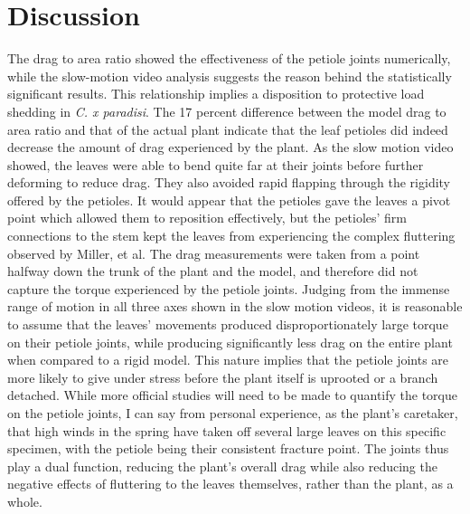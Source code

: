 \section{Discussion}

	The drag to area ratio showed the effectiveness of the petiole joints numerically, while the slow-motion video analysis suggests the reason behind the statistically significant results. This relationship implies a disposition to protective load shedding in \emph{C. x paradisi}.
	The 17 percent difference between the model drag to area ratio and that of the actual plant indicate that the leaf petioles did indeed decrease the amount of drag experienced by the plant. As the slow motion video showed, the leaves were able to bend quite far at their joints before further deforming to reduce drag. They also avoided rapid flapping through the rigidity offered by the petioles. It would appear that the petioles gave the leaves a pivot point which allowed them to reposition effectively, but the petioles' firm connections to the stem kept the leaves from experiencing the complex fluttering observed by Miller, et al.
    The drag measurements were taken from a point halfway down the trunk of the plant and the model, and therefore did not capture the torque experienced by the petiole joints. Judging from the immense range of motion in all three axes shown in the slow motion videos, it is reasonable to assume that the leaves' movements produced disproportionately large torque on their petiole joints, while producing significantly less drag on the entire plant when compared to a rigid model. This nature implies that the petiole joints are more likely to give under stress before the plant itself is uprooted or a branch detached. While more official studies will need to be made to quantify the torque on the petiole joints, I can say from personal experience, as the plant's caretaker, that high winds in the spring have taken off several large leaves on this specific specimen, with the petiole being their consistent fracture point. The joints thus play a dual function, reducing the plant's overall drag while also reducing the negative effects of fluttering to the leaves themselves, rather than the plant, as a whole.
